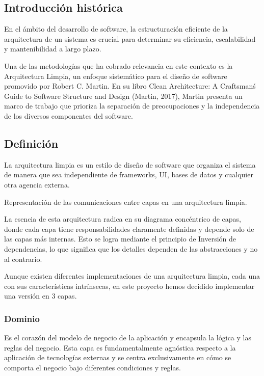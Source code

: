 \subsection*{Introducción histórica}
En el ámbito del desarrollo de software, la estructuración eficiente de la arquitectura de un sistema
es crucial para determinar su eficiencia, escalabilidad y mantenibilidad a largo plazo.

Una de las metodologías que ha cobrado relevancia en este contexto es la Arquitectura Limpia,
un enfoque sistemático para el diseño de software promovido por
Robert C. Martin. En su libro Clean Architecture: A Craftsman\'s Guide to Software Structure and Design (Martin,
2017), Martin presenta un marco de trabajo que prioriza la separación de preocupaciones y la independencia de los
diversos componentes del software.

\subsection*{Definición}
La arquitectura limpia es un estilo de diseño de software que
organiza el sistema de manera que sea independiente de frameworks, UI, bases de datos y cualquier otra agencia externa.


Representación de las comunicaciones entre capas en una arquitectura limpia.

La esencia de esta arquitectura radica en su diagrama concéntrico de capas, donde cada capa tiene responsabilidades
claramente definidas y depende solo de las capas más internas.
Esto se logra mediante el principio de Inversión de dependencias, lo que significa que los detalles dependen de las
abstracciones y no al contrario.

Aunque existen diferentes implementaciones de una arquitectura limpia, cada una con sus características intrínsecas, en
este proyecto hemos decidido implementar una versión en 3 capas.

\subsubsection*{Dominio}
Es el corazón del modelo de negocio de la aplicación y encapsula la
lógica y las reglas del negocio. Esta capa es fundamentalmente
agnóstica respecto a la aplicación de tecnologías externas y se
centra exclusivamente en cómo se comporta el negocio bajo diferentes condiciones y reglas.

